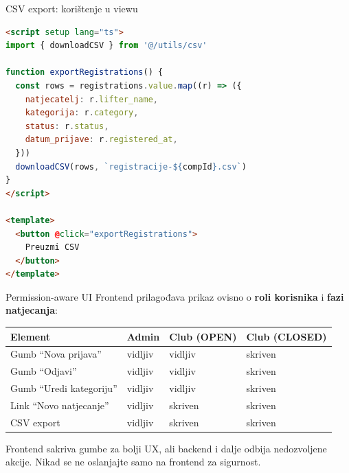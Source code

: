 \begin{frame}[fragile,shrink=5]{CSV export: korištenje u viewu}
\begin{lstlisting}[language=html]
<script setup lang="ts">
import { downloadCSV } from '@/utils/csv'

function exportRegistrations() {
  const rows = registrations.value.map((r) => ({
    natjecatelj: r.lifter_name,
    kategorija: r.category,
    status: r.status,
    datum_prijave: r.registered_at,
  }))
  downloadCSV(rows, `registracije-${compId}.csv`)
}
</script>

<template>
  <button @click="exportRegistrations">
    Preuzmi CSV
  </button>
</template>
\end{lstlisting}
\end{frame}

\begin{frame}{Permission-aware UI}
Frontend prilagođava prikaz ovisno o \textbf{roli korisnika} i \textbf{fazi natjecanja}:

\vspace{0.4em}
\begin{tabular}{@{}llll@{}}
  \toprule
  \textbf{Element} & \textbf{Admin} & \textbf{Club (OPEN)} & \textbf{Club (CLOSED)} \\
  \midrule
  Gumb \enquote{Nova prijava} & vidljiv & vidljiv & skriven \\
  Gumb \enquote{Odjavi} & vidljiv & vidljiv & skriven \\
  Gumb \enquote{Uredi kategoriju} & vidljiv & vidljiv & skriven \\
  Link \enquote{Novo natjecanje} & vidljiv & skriven & skriven \\
  CSV export & vidljiv & skriven & skriven \\
  \bottomrule
\end{tabular}

\vspace{0.6em}
Frontend sakriva gumbe za bolji UX, ali backend i dalje odbija nedozvoljene akcije. Nikad se ne oslanjajte samo na frontend za sigurnost.
\end{frame}

